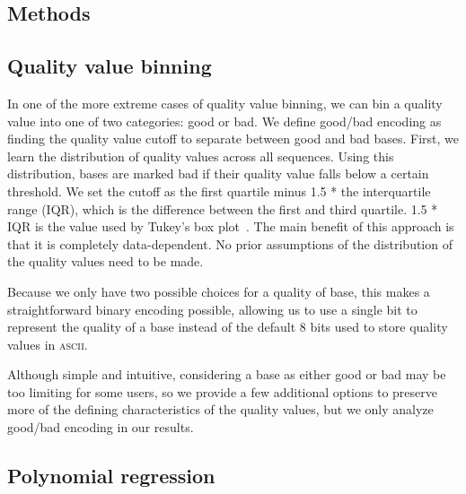 \documentclass{bioinfo}
\begin{document}
\begin{methods}
\section{Methods}

\subsection{Quality value binning}


In one of the more extreme cases of quality value binning, we can bin a quality value into one of two categories: good or bad.
We define good/bad encoding as finding the quality value cutoff to separate between good and bad bases.
First, we learn the distribution of quality values across all sequences.
Using this distribution, bases are marked bad if their quality value falls below a certain threshold.
We set the cutoff as the first quartile minus 1.5 * the interquartile range (IQR), which is the difference between the first and third quartile.
1.5 * IQR is the value used by Tukey's box plot~\cite{mcgill1978variations}.
The main benefit of this approach is that it is completely data-dependent. No prior assumptions of the distribution of the quality values need to be made.
 
Because we only have two possible choices for a quality of base, this makes a straightforward binary encoding possible, allowing us to use a single bit to represent the quality of a base instead of the default 8 bits used to store quality values in \textsc{ascii}.

Although simple and intuitive, considering a base as either good or bad may be too limiting for some users, so we provide a few additional options to preserve more of the defining characteristics of the quality values, but we only analyze good/bad encoding in our results.

\subsection{Polynomial regression}


\end{methods}
\end{document}
